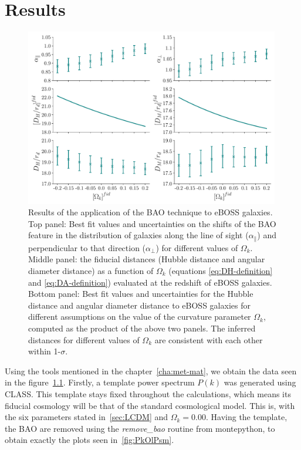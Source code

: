 \chapter{Results}
\label{cha:results}


\begin{figure}[b]
	\centering
	\includegraphics[width=0.99\textwidth]{../figs/phase2_DA_DH_flat.pdf}
%
	\caption{Results of the application of the BAO technique to eBOSS galaxies. Top panel: Best fit values and uncertainties on the shifts of the BAO feature in the distribution of galaxies along the line of sight ($\alpha_\parallel$) and perpendicular to that direction ($\alpha_\perp$) for different values of $\Omega_k$. Middle panel: the fiducial distances (Hubble distance and angular diameter distance) as a function of $\Omega_k$ (equations \eqref{eq:DH-definition} and \eqref{eq:DA-definition}) evaluated at the redshift of eBOSS galaxies. Bottom panel: Best fit values and uncertainties for the Hubble distance and angular diameter distance to eBOSS galaxies for different assumptions on the value of the curvature parameter $\Omega_k$, computed as the product of the above two panels. The inferred distances for different values of $\Omega_k$ are consistent with each other within 1-$\sigma$.}
	\label{fig:DA_DH}
\end{figure}

Using the tools mentioned in the chapter~\ref{cha:met-mat}, we obtain the data seen in the figure~\ref{fig:DA_DH}. Firstly, a template power spectrum $P(k)$ was generated using CLASS. This template stays fixed throughout the calculations, which means its fiducial cosmology will be that of the standard cosmological model. This is, with the six parameters stated in~\ref{sec:LCDM} and $\Omega_k=0.00$. Having the template, the BAO are removed using the \textit{remove\_bao} routine from montepython, to obtain exactly the plots seen in~\ref{fig:PkOlPsm}. \\

